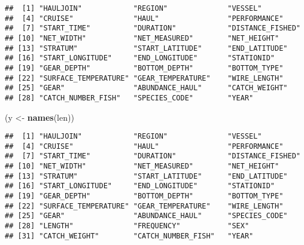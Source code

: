 \documentclass[
]{article}
\newenvironment{Shaded}{\begin{snugshade}}{\end{snugshade}}
\newcommand{\CommentTok}[1]{\textcolor[rgb]{0.56,0.35,0.01}{\textit{#1}}}
\newcommand{\KeywordTok}[1]{\textcolor[rgb]{0.13,0.29,0.53}{\textbf{#1}}}
\newcommand{\NormalTok}[1]{#1}
\newcommand{\OperatorTok}[1]{\textcolor[rgb]{0.81,0.36,0.00}{\textbf{#1}}}
\newcommand{\StringTok}[1]{\textcolor[rgb]{0.31,0.60,0.02}{#1}}
\begin{document}
\begin{verbatim}
##  [1] "HAULJOIN"            "REGION"              "VESSEL"             
##  [4] "CRUISE"              "HAUL"                "PERFORMANCE"        
##  [7] "START_TIME"          "DURATION"            "DISTANCE_FISHED"    
## [10] "NET_WIDTH"           "NET_MEASURED"        "NET_HEIGHT"         
## [13] "STRATUM"             "START_LATITUDE"      "END_LATITUDE"       
## [16] "START_LONGITUDE"     "END_LONGITUDE"       "STATIONID"          
## [19] "GEAR_DEPTH"          "BOTTOM_DEPTH"        "BOTTOM_TYPE"        
## [22] "SURFACE_TEMPERATURE" "GEAR_TEMPERATURE"    "WIRE_LENGTH"        
## [25] "GEAR"                "ABUNDANCE_HAUL"      "CATCH_WEIGHT"       
## [28] "CATCH_NUMBER_FISH"   "SPECIES_CODE"        "YEAR"
\end{verbatim}

\begin{Shaded}
\begin{Highlighting}[]
\NormalTok{(y <-}\StringTok{ }\KeywordTok{names}\NormalTok{(len))}
\end{Highlighting}
\end{Shaded}

\begin{verbatim}
##  [1] "HAULJOIN"            "REGION"              "VESSEL"             
##  [4] "CRUISE"              "HAUL"                "PERFORMANCE"        
##  [7] "START_TIME"          "DURATION"            "DISTANCE_FISHED"    
## [10] "NET_WIDTH"           "NET_MEASURED"        "NET_HEIGHT"         
## [13] "STRATUM"             "START_LATITUDE"      "END_LATITUDE"       
## [16] "START_LONGITUDE"     "END_LONGITUDE"       "STATIONID"          
## [19] "GEAR_DEPTH"          "BOTTOM_DEPTH"        "BOTTOM_TYPE"        
## [22] "SURFACE_TEMPERATURE" "GEAR_TEMPERATURE"    "WIRE_LENGTH"        
## [25] "GEAR"                "ABUNDANCE_HAUL"      "SPECIES_CODE"       
## [28] "LENGTH"              "FREQUENCY"           "SEX"                
## [31] "CATCH_WEIGHT"        "CATCH_NUMBER_FISH"   "YEAR"
\end{verbatim}

\begin{Shaded}
\end{Shaded}
\end{document}
